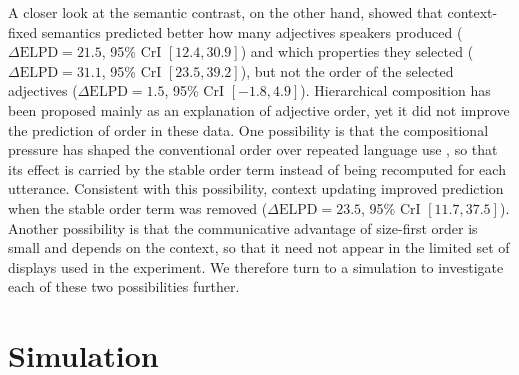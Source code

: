 \documentclass[10pt,a4paper,fleqn]{article}
\begin{document}
A closer look at the semantic contrast, on the other hand, showed that context-fixed semantics predicted better how many adjectives speakers produced ($\Delta\mathrm{ELPD}=21.5$, 95\% CrI $[12.4,30.9]$) and which properties they selected ($\Delta\mathrm{ELPD}=31.1$, 95\% CrI $[23.5,39.2]$), but not the order of the selected adjectives ($\Delta\mathrm{ELPD}=1.5$, 95\% CrI $[-1.8,4.9]$).
Hierarchical composition has been proposed mainly as an explanation of adjective order, yet it did not improve the prediction of order in these data.
One possibility is that the compositional pressure has shaped the conventional order over repeated language use \citep{scontras2019grammatical}, so that its effect is carried by the stable order term instead of being recomputed for each utterance.
Consistent with this possibility, context updating improved prediction when the stable order term was removed ($\Delta\mathrm{ELPD}=23.5$, 95\% CrI $[11.7,37.5]$).
Another possibility is that the communicative advantage of size-first order is small and depends on the context, so that it need not appear in the limited set of displays used in the experiment.
We therefore turn to a simulation to investigate each of these two possibilities further.

\section{Simulation}
\label{sec:simulation}
\end{document}

